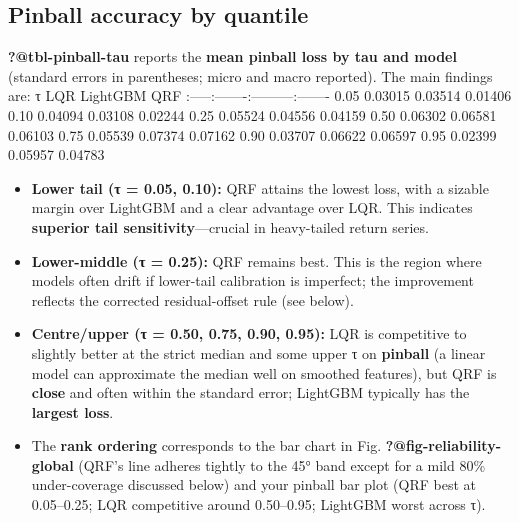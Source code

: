 \documentclass[
  a4paper,
  DIV=11,
  numbers=noendperiod]{scrreprt}
\providecommand{\tightlist}{%
  \setlength{\itemsep}{0pt}\setlength{\parskip}{0pt}}
\begin{document}
\subsection{Pinball accuracy by
quantile}\label{pinball-accuracy-by-quantile}

\textbf{?@tbl-pinball-tau} reports the \textbf{mean pinball loss by tau
and model} (standard errors in parentheses; micro and macro reported).
The main findings are: \textbar{} τ \textbar{} LQR \textbar{} LightGBM
\textbar{} QRF \textbar{}
\textbar:-----\textbar:-------\textbar:---------\textbar:-------\textbar{}
\textbar{} 0.05 \textbar{} 0.03015\textbar{} 0.03514 \textbar{}
0.01406\textbar{} \textbar{} 0.10 \textbar{} 0.04094\textbar{} 0.03108
\textbar{} 0.02244\textbar{} \textbar{} 0.25 \textbar{}
0.05524\textbar{} 0.04556 \textbar{} 0.04159\textbar{} \textbar{} 0.50
\textbar{} 0.06302\textbar{} 0.06581 \textbar{} 0.06103\textbar{}
\textbar{} 0.75 \textbar{} 0.05539\textbar{} 0.07374 \textbar{}
0.07162\textbar{} \textbar{} 0.90 \textbar{} 0.03707\textbar{} 0.06622
\textbar{} 0.06597\textbar{} \textbar{} 0.95 \textbar{}
0.02399\textbar{} 0.05957 \textbar{} 0.04783\textbar{}

\begin{itemize}
\tightlist
\item
  \textbf{Lower tail (τ = 0.05, 0.10):} QRF attains the lowest loss,
  with a sizable margin over LightGBM and a clear advantage over LQR.
  This indicates \textbf{superior tail sensitivity}---crucial in
  heavy-tailed return series.
\item
  \textbf{Lower-middle (τ = 0.25):} QRF remains best. This is the region
  where models often drift if lower-tail calibration is imperfect; the
  improvement reflects the corrected residual-offset rule (see below).
\item
  \textbf{Centre/upper (τ = 0.50, 0.75, 0.90, 0.95):} LQR is competitive
  to slightly better at the strict median and some upper τ on
  \textbf{pinball} (a linear model can approximate the median well on
  smoothed features), but QRF is \textbf{close} and often within the
  standard error; LightGBM typically has the \textbf{largest loss}.
\item
  The \textbf{rank ordering} corresponds to the bar chart in Fig.
  \textbf{?@fig-reliability-global} (QRF's line adheres tightly to the
  45° band except for a mild 80\% under-coverage discussed below) and
  your pinball bar plot (QRF best at 0.05--0.25; LQR competitive around
  0.50--0.95; LightGBM worst across τ).
\end{itemize}
\end{document}
